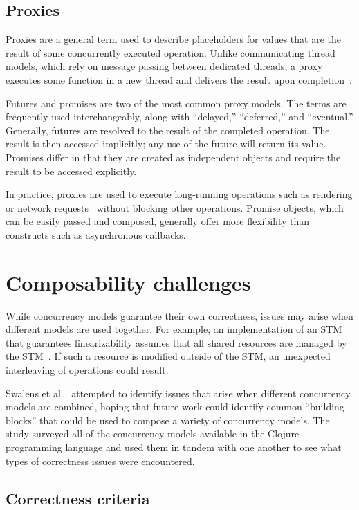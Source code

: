\documentclass{sig-alternate}
\begin{document}
\subsection{Proxies}

Proxies are a general term used to describe placeholders for values that are the result of some concurrently executed operation. Unlike communicating thread models, which rely on message passing between dedicated threads, a proxy executes some function in a new thread and delivers the result upon completion~\cite{Swalens2014}.

Futures and promises are two of the most common proxy models. The terms are frequently used interchangeably, along with ``delayed,'' ``deferred,'' and ``eventual.'' Generally, futures are resolved to the result of the completed operation. The result is then accessed implicitly; any use of the future will return its value. Promises differ in that they are created as independent objects and require the result to be accessed explicitly.

In practice, proxies are used to execute long-running operations such as rendering or network requests~\cite{Swalens2014} without blocking other operations. Promise objects, which can be easily passed and composed, generally offer more flexibility than constructs such as asynchronous callbacks.

\section{Composability challenges}

While concurrency models guarantee their own correctness, issues may arise when different models are used together. For example, an implementation of an STM that guarantees linearizability assumes that all shared resources are managed by the STM~\cite{Shavit1995}. If such a resource is modified outside of the STM, an unexpected interleaving of operations could result.

Swalens et al.~\cite{Swalens2014} attempted to identify issues that arise when different concurrency models are combined, hoping that future work could identify common ``building blocks'' that could be used to compose a variety of concurrency models. The study surveyed all of the concurrency models available in the Clojure programming language and used them in tandem with one another to see what types of correctness issues were encountered.

\subsection{Correctness criteria}
\end{document}
